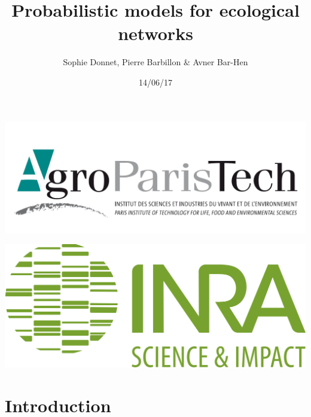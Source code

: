 \documentclass[nopagenumber,9pt]{beamer}
\title
{Probabilistic models for ecological networks}%
\author{Sophie Donnet,  Pierre Barbillon \& Avner Bar-Hen}
\date{
% 
14/06/17}
\begin{document}
\begin{frame}
\titlepage

\vspace{-.5cm}
\includegraphics[scale=.1]{plots/AgroParisTech_-_logo.PNG}
\vspace{-1.2cm}
\begin{flushright}
 \includegraphics[scale=.1]{plots/INRA_logo.jpg}
 \end{flushright}

\end{frame}



\section{Introduction}
\end{document}
